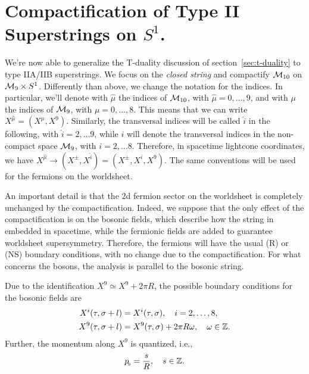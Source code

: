 \section{Compactification of Type II Superstrings on \texorpdfstring{$S^1$}{S1}.}
We're now able to generalize the T-duality discussion of section~\ref{sec:t-duality} to type IIA/IIB superstrings. We focus on the \emph{closed string} and compactify $\mathcal{M}_{10}$ on $\mathcal{M}_{9} \times S^1$. Differently than above, we change the notation for the indices. In particular, we'll denote with $\hat{\mu}$ the indices of $\mathcal{M}_{10}$, with $\hat{\mu} = 0, \dots, 9$, and with $\mu$ the indices of $\mathcal{M}_{9}$, with $\mu = 0, \dots , 8$. This means that we can write $X^{\hat{\mu}} = (X^\mu, X^{9})$. Similarly, the transversal indices will be called $\hat{i}$ in the following, with $\hat{i} = 2, \dots 9$, while $i$ will denote the transversal indices in the non-compact space $\mathcal{M}_{9}$, with $i = 2, \dots 8$. Therefore, in spacetime lightcone coordinates, we have $X^{\hat{\mu}} \to (X^\pm, X^{\hat{i}}) = (X^\pm, X^i, X^{9})$. The same conventions will be used for the fermions on the worldsheet.

An important detail is that the $2$d fermion sector on the worldsheet is completely unchanged by the compactification. Indeed, we suppose that the only effect of the compactification is on the bosonic fields, which describe how the string in embedded in spacetime, while the fermionic fields are added to guarantee worldsheet supersymmetry. Therefore, the fermions will have the usual (R) or (NS) boundary conditions, with no change due to the compactification. For what concerns the bosons, the analysis is parallel to the bosonic string.

Due to the identification $X^9 \simeq X^9 + 2\pi R$, the possible boundary conditions for the bosonic fields are
\begin{equation}
\begin{aligned}
    X^i (\tau, \sigma +l) &= X^i(\tau,\sigma), \quad i = 2, \dots, 8, \\
    X^9(\tau,\sigma + l) &= X^9(\tau,\sigma) + 2\pi R \omega, \quad \omega \in \mathbb{Z} .
\end{aligned}
\end{equation}
Further, the momentum along $X^9$ is quantized, i.e.,
\begin{equation}
    p_{\!_{9}} = \frac{s}{R}, \quad s \in \mathbb{Z}.
\end{equation}

